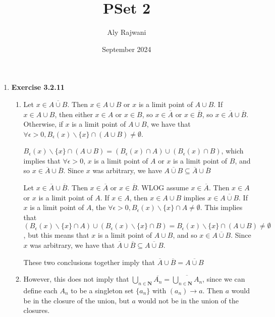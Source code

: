 \documentclass{article}
\title{PSet 2}
\author{Aly Rajwani}
\date{September 2024}
\begin{document}
\maketitle

\begin{enumerate}
    \item \textbf{Exercise 3.2.11}
    \begin{enumerate}
        \item Let $x \in \overline{A\cup B}$. Then $x \in A \cup B$ or $x$ is a limit point of $A \cup B$. If $x \in A \cup B$, then either $x \in A$ or $x \in B$, so $x \in \overline{A}$ or $x \in \overline{B}$, so $x \in \overline{A} \cup \overline{B}$. Otherwise, if $x$ is a limit point of $A \cup B$, we have that $\forall \epsilon > 0, B_\epsilon(x) \backslash \{x\} \cap (A \cup B) \neq \emptyset$. 

        \smallskip
        

        $B_\epsilon(x) \backslash \{x\} \cap (A \cup B) = (B_\epsilon(x) \cap A) \cup (B_\epsilon(x) \cap B)$, which implies that $\forall \epsilon > 0$, $x$ is a limit point of $A$ or $x$ is a limit point of $B$, and so $x \in \overline{A} \cup \overline{B}$. Since $x$ was arbitrary, we have $\overline{A \cup B} \subseteq \overline{A} \cup \overline{B}$

        \smallskip

        Let $x \in \overline{A} \cup \overline{B}$. Then $x \in \overline{A}$ or $x \in \overline{B}$. WLOG assume $x \in \overline{A}$. Then $x \in A$ or $x$ is a limit point of $A$. If $x \in A$, then $x \in A \cup B$ implies $x \in \overline{A \cup B}$. If $x$ is a limit point of $A$, the $\forall \epsilon > 0, B_\epsilon(x) \backslash \{x\} \cap A \neq \emptyset$. This implies that $(B_\epsilon(x) \backslash \{x\} \cap A) \cup (B_\epsilon(x) \backslash \{x\} \cap B) = B_\epsilon(x) \backslash \{x\} \cap (A \cup B) \neq \emptyset$, but this means that $x$ is a limit point of $A \cup B$, and so $x \in \overline{A \cup B}$. Since $x$ was arbitrary, we have that $\overline{A} \cup \overline{B} \subseteq \overline{A \cup B}$.

        \smallskip

        These two conclusions together imply that $\overline{A} \cup \overline{B} = \overline{A \cup B}$

        \item However, this does not imply that $\bigcup_{n \in \mathbf{N}} \overline{A_n} = \overline{\bigcup_{n \in \mathbf{N}} A_n}$, since we can define each $A_n$ to be a singleton set $\{a_n\}$ with $(a_n) \rightarrow a$. Then $a$ would be in the closure of the union, but $a$ would not be in the union of the closures.


\end{enumerate}
\end{enumerate}
\end{document}
